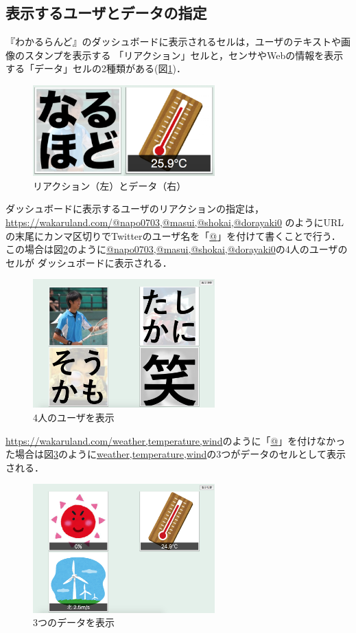 \subsection{表示するユーザとデータの指定}

『わかるらんど』のダッシュボードに表示されるセルは，ユーザのテキストや画像のスタンプを表示する
「リアクション」セルと，センサやWebの情報を表示する「データ」セルの2種類がある(図\ref{cell})．

\begin{figure}[h]
\centering
\includegraphics[width=7cm]{images/cell.png}
\caption{リアクション（左）とデータ（右）}
\label{cell}
\end{figure}

ダッシュボードに表示するユーザのリアクションの指定は，
\url{https://wakaruland.com/@napo0703,@masui,@shokai,@dorayaki0}
のようにURLの末尾にカンマ区切りでTwitterのユーザ名を「\url{@}」を付けて書くことで行う．
この場合は図\ref{n_m_s_d}のように\url{@napo0703,@masui,@shokai,@dorayaki0}の4人のユーザのセルが
ダッシュボードに表示される．

\begin{figure}[h]
\centering
\includegraphics[width=7cm]{images/n_m_s_d.png}
\caption{4人のユーザを表示}
\label{n_m_s_d}
\end{figure}

\url{https://wakaruland.com/weather,temperature,wind}のように「\url{@}」を付けなかった場合は図\ref{w_t_w}のように\url{weather,temperature,wind}の3つがデータのセルとして表示される．

\begin{figure}[h]
\centering
\includegraphics[width=7cm]{images/w_t_w.png}
\caption{3つのデータを表示}
\label{w_t_w}
\end{figure}


